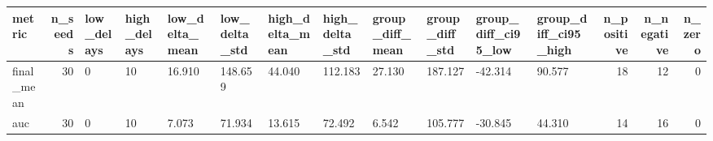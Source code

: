 \begin{tabular}{lrllllllllllrrr}
\toprule
metric & n_seeds & low_delays & high_delays & low_delta_mean & low_delta_std & high_delta_mean & high_delta_std & group_diff_mean & group_diff_std & group_diff_ci95_low & group_diff_ci95_high & n_positive & n_negative & n_zero \\
\midrule
final_mean & 30 & 0 & 10 & 16.910 & 148.659 & 44.040 & 112.183 & 27.130 & 187.127 & -42.314 & 90.577 & 18 & 12 & 0 \\
auc & 30 & 0 & 10 & 7.073 & 71.934 & 13.615 & 72.492 & 6.542 & 105.777 & -30.845 & 44.310 & 14 & 16 & 0 \\
\bottomrule
\end{tabular}
